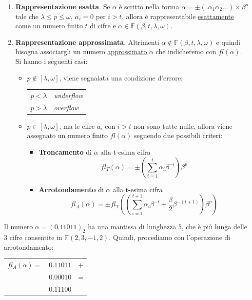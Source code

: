 \documentclass{article}
\begin{document}
\begin{enumerate}
    \item \textbf{Rappresentazione esatta}. Se $\alpha$ è scritto nella forma
        $\alpha=\pm(.\alpha_1\alpha_2\ldots)\times\beta^{p}$ tale che
        $\lambda\leq p\leq\omega$, $\alpha_i=0$ per $i> t$, allora è
        rappresentabile \underline{esattamente} come un numero finito $t$ di
        cifre e $\alpha\in \mathbb{F}(\beta,t,\lambda,\omega)$.
    \item \textbf{Rappresentazione approssimata}. Altrimenti 
        $\alpha\notin \mathbb{F}(\beta,t,\lambda,\omega)$ e quindi
        bisogna associargli un numero \underline{approssimato} $\tilde\alpha$
        che indicheremo con $fl(\alpha)$. Si hanno i seguenti casi:
        \begin{itemize}
            \item $p\notin[\lambda,\omega]$, viene segnalata una condizione
                d'errore:
                \begin{center}
                    \begin{tabular}{ll}
                        $p<\lambda$ & \textit{underflow} \\ 
                        $p>\lambda$ & \textit{overflow} \\ 
                   \end{tabular} 
                \end{center}
            \item $p\in[\lambda,\omega]$, ma le cifre $a_i$ con $i>t$ non sono
                tutte nulle, allora viene assegnato un numero finito $fl(\alpha)$
                seguendo due possibili criteri:
                \begin{itemize}
                    \item\textbf{Troncamento} di $\alpha$ alla t-esima cifra
                        $$fl_{T}(\alpha)=\pm(\sum_{i=1}^{t}\alpha_i\beta^{-i})\beta^p$$
                    \item\textbf{Arrotondamento} di $\alpha$ alla t-esima cifra 
                        $$fl_{A}(\alpha)=\pm
                        fl_{T}((\sum_{i=1}^{t+1}\alpha_i\beta^{-i}+\frac{\beta}{2}\beta^{-(t+1)})\beta^p)$$
                \end{itemize}
        \end{itemize}
\end{enumerate}
\begin{example}
    Il numero $\alpha=(0.11011)_2$ ha una mantissa di lunghezza 5, che è più
    lunga delle 3 cifre consentite in $\mathbb{F}(2,3,-1,2)$. Quindi, procediamo
    con l'operazione di arrotondamento:
    \begin{center}
       \begin{tabular}{lll}
           $fl_{A}(\alpha)=$ & $0.11011$ & + \\ 
                        & $0.00010$ & = \\ 
                        \hline
                        & $0.11100$ & \\ 
       \end{tabular} 
    \end{center}
\end{example}
\end{document}
